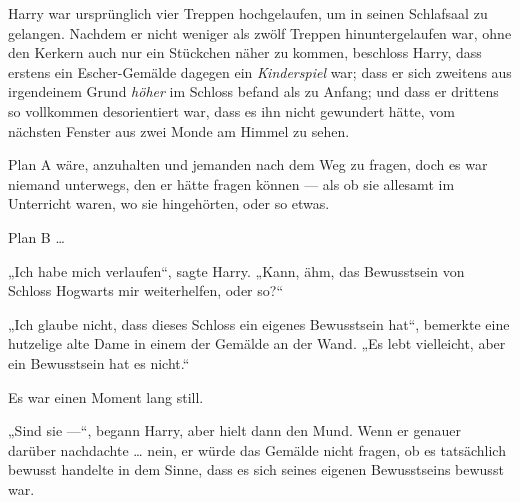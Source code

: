 Harry war ursprünglich vier Treppen hochgelaufen, um in seinen Schlafsaal zu gelangen. Nachdem er nicht weniger als zwölf Treppen hinuntergelaufen war, ohne den Kerkern auch nur ein Stückchen näher zu kommen, beschloss Harry, dass erstens ein Escher-Gemälde dagegen ein \emph{Kinderspiel} war; dass er sich zweitens aus irgendeinem Grund \emph{höher} im Schloss befand als zu Anfang; und dass er drittens so vollkommen desorientiert war, dass es ihn nicht gewundert hätte, vom nächsten Fenster aus zwei Monde am Himmel zu sehen.

Plan A wäre, anzuhalten und jemanden nach dem Weg zu fragen, doch es war niemand unterwegs, den er hätte fragen können — als ob sie allesamt im Unterricht waren, wo sie hingehörten, oder so etwas.

Plan B …

„Ich habe mich verlaufen“, sagte Harry.
„Kann, ähm, das Bewusstsein von Schloss Hogwarts mir weiterhelfen, oder so?“

„Ich glaube nicht, dass dieses Schloss ein eigenes Bewusstsein hat“, bemerkte eine hutzelige alte Dame in einem der Gemälde an der Wand.
„Es lebt vielleicht, aber ein Bewusstsein hat es nicht.“

Es war einen Moment lang still.

„Sind sie —“, begann Harry, aber hielt dann den Mund. Wenn er genauer darüber nachdachte … nein, er würde das Gemälde nicht fragen, ob es tatsächlich bewusst handelte in dem Sinne, dass es sich seines eigenen Bewusstseins bewusst war.

